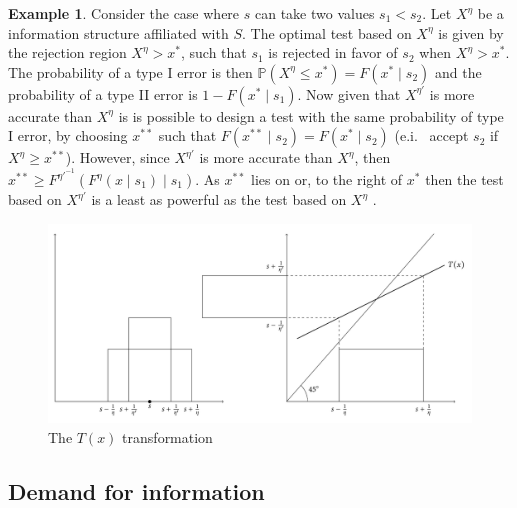 \documentclass[10pt,a4paper]{article} %
\theoremstyle{definition}
\newtheorem{example}{Example}[section]
\theoremstyle{remark}
\begin{document}
\begin{example}
Consider the case where $s$ can take two values $s_{1}<s_{2}$. Let
$X^{\eta}$ be a information structure affiliated with $S$. The optimal
test based on $X^{\eta}$ is given by the rejection region $X^{\eta}>x^{*}$,
such that $s_{1}$ is rejected in favor of $s_{2}$ when $X^{\eta}>x^{*}$.
The probability of a type I error is then $\mathbb{P}(X^{\eta}\le x^{*})=F(x^{*}\mid s_{2})$
and the probability of a type II error is $1-F(x^{*}\mid s_{1})$.
Now given that $X^{\eta'}$ is more accurate than $X^{\eta}$ is is
possible to design a test with the same probability of type I error,
by choosing $x^{**}$ such that $F(x^{**}\mid s_{2})=F(x^{*}\mid s_{2})$
(e.i. \ accept $s_{2}$ if $X^{\eta}\ge x^{**}$). However, since $X^{\eta'}$
is more accurate than $X^{\eta}$, then $x^{**}\ge F^{\eta'^{-1}}(F^{\eta}(x\mid s_{1})\mid s_{1})$.
As $x^{**}$ lies on or, to the right of $x^{*}$ then the test based
on $X^{\eta'}$ is a least as powerful as the test based on $X^{\eta}$
\citep{Lehmann1988,Persico2000}.

\begin{figure}
\includegraphics[width=\textwidth]{fig/t-transformation.pdf}
\protect\caption{The $T(x)$ transformation}
\end{figure}

\end{example}


\subsection{Demand for information}
\end{document}
